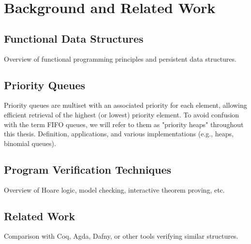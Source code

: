 \chapter { Background and Related Work }
\section { Functional Data Structures }
Overview of functional programming principles and persistent data structures.

\section { Priority Queues }
Priority queues are multiset with an associated priority for each element, allowing efficient retrieval of the highest (or lowest) priority element.
To avoid confusion with the term FIFO queues, we will refer to them as "priority heaps" throughout this thesis.
Definition, applications, and various implementations (e.g., heaps, binomial queues).

\section { Program Verification Techniques }
Overview of Hoare logic, model checking, interactive theorem proving, etc.

\section { Related Work }
Comparison with Coq, Agda, Dafny, or other tools verifying similar structures.
